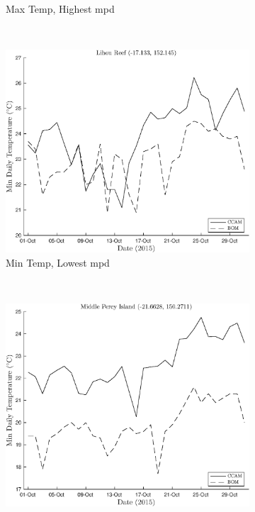 \begin{figure}[!hbt]
\begin{subfigure}[b]{0.45\textwidth}
	    \caption{Max Temp, Highest \gls{mpd}}
	    \label{subfig:maxtladyelliot}
    \end{subfigure}
    \\
    \vspace{0.5cm}
    \begin{subfigure}[b]{0.45\textwidth}
        \includegraphics[width=\textwidth]{Fig/Research/BomComparison/MinTemp_vs_Time_Lihou_Reef.eps}
	    \caption{Min Temp, Lowest \gls{mpd}}
	    \label{subfig:maxtlihoureef}
    \end{subfigure}
	~~~
	\begin{subfigure}[b]{0.45\textwidth}
		\includegraphics[width=\textwidth]{Fig/Research/BomComparison/MinTemp_vs_Time_Middle_Percy_Island.eps}

\end{subfigure}
\end{figure}
